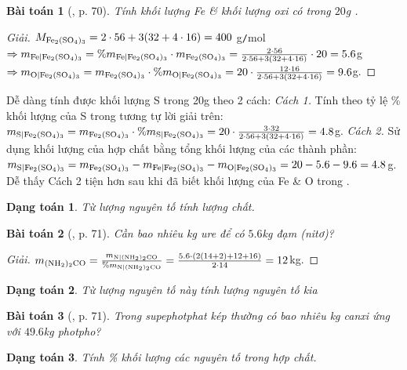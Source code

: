 \documentclass{article}
\newtheorem{baitoan}{Bài toán}
\newtheorem{dangtoan}{Dạng toán}
\begin{document}
\begin{baitoan}[\cite{Tuan2022}, p. 70]
	Tính khối lượng \emph{Fe} \& khối lượng oxi có trong $20$\emph{g} \emph{}.
\end{baitoan}

\begin{proof}[Giải]
	$M_{\ce{Fe2(SO4)3}} = 2\cdot56 + 3(32 + 4\cdot16) = 400$ g\texttt{/}mol$\Rightarrow m_{\ce{Fe|Fe2(SO4)3}} = \%m_{\ce{Fe|Fe2(SO4)3}}\cdot m_{\ce{Fe2(SO4)3}} = \frac{2\cdot56}{2\cdot56 + 3(32 + 4\cdot16)}\cdot20 = 5.6$g$\Rightarrow m_{\ce{O|Fe2(SO4)3}} = m_{\ce{Fe2(SO4)3}}\cdot\%m_{\ce{O|Fe2(SO4)3}} = 20\cdot\frac{12\cdot16}{2\cdot56 + 3(32 + 4\cdot16)} = 9.6$g.
\end{proof}
Dễ dàng tính được khối lượng S trong 20g  theo 2 cách: \textit{Cách 1.} Tính theo tỷ lệ \% khối lượng của S trong  tương tự lời giải trên: $m_{\ce{S|Fe2(SO4)3}} = m_{\ce{Fe2(SO4)3}}\cdot\%m_{\ce{S|Fe2(SO4)3}} = 20\cdot\frac{3\cdot32}{2\cdot56 + 3(32 + 4\cdot16)} = 4.8$g. \textit{Cách 2.} Sử dụng khối lượng của hợp chất bằng tổng khối lượng của các thành phần: $m_{\ce{S|Fe2(SO4)3}} = m_{\ce{Fe2(SO4)3}} - m_{\ce{Fe|Fe2(SO4)3}} - m_{\ce{O|Fe2(SO4)3}} = 20 - 5.6 - 9.6 = 4.8$g. Dễ thấy Cách 2 tiện hơn sau khi đã biết khối lượng của Fe \& O trong .

\begin{dangtoan}
	Từ lượng nguyên tố tính lượng chất.
\end{dangtoan}

\begin{baitoan}[\cite{Tuan2022}, p. 71]
	Cần bao nhiêu \emph{kg} ure \emph{} để có $5.6$\emph{kg} đạm (nitơ)?
\end{baitoan}

\begin{proof}[Giải]
	$m_{\ce{(NH2)2CO}} = \frac{m_{\ce{N|(NH2)2CO}}}{\%m_{\ce{N|(NH2)2CO}}} = \frac{5.6\cdot(2(14 + 2) + 12 + 16)}{2\cdot14} = 12$kg.
\end{proof}

\begin{dangtoan}
	Từ lượng nguyên tố này tính lượng nguyên tố kia
\end{dangtoan}

\begin{baitoan}[\cite{Tuan2022}, p. 71]
	Trong supephotphat kép thường có bao nhiêu kg canxi ứng với $49.6$\emph{kg} photpho?
\end{baitoan}

\begin{dangtoan}
	Tính \% khối lượng các nguyên tố trong hợp chất.
\end{dangtoan}
\end{document}
